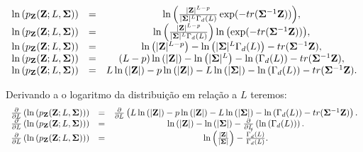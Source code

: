 \documentclass[12pt,a4paper]{article}
\begin{document}
\begin{equation}\label{sec41eqn6}
\begin{array}{ccc}
	\ln{\left(p_{{\bf Z}}({\bf Z};L,{\bf \Sigma})\right)}&=&\ln{\left(\frac{|{\bf Z}|^{L-p}}{|{\bf \Sigma}|^{L}\Gamma_d(L)} \exp(-tr({\bf \Sigma}^{-1}{\bf Z}))\right)}, \\
	\ln{\left(p_{{\bf Z}}({\bf Z};L,{\bf \Sigma})\right)}&=&\ln{\left(\frac{|{\bf Z}|^{L-p}}{|{\bf \Sigma}|^{L}\Gamma_d(L)}\right)}\ln{\left( \exp(-tr({\bf \Sigma}^{-1}{\bf Z}))\right)}, \\
	\ln{\left(p_{{\bf Z}}({\bf Z};L,{\bf \Sigma})\right)}&=&\ln{\left(|{\bf Z}|^{L-p}\right)} - \ln{\left(|{\bf \Sigma}|^{L}\Gamma_d(L)\right)}-tr({\bf \Sigma}^{-1}{\bf Z}), \\
	\ln{\left(p_{{\bf Z}}({\bf Z};L,{\bf \Sigma})\right)}&=&(L-p)\ln{\left(|{\bf Z}|\right)} - \ln{\left(|{\bf \Sigma}|^{L}\right)}-\ln{\left(\Gamma_d(L)\right)}-tr({\bf \Sigma}^{-1}{\bf Z}), \\
	\ln{\left(p_{{\bf Z}}({\bf Z};L,{\bf \Sigma})\right)}&=&L\ln{\left(|{\bf Z}|\right)}-p\ln{\left(|{\bf Z}|\right)} - L\ln{\left(|{\bf \Sigma}|\right)}-\ln{\left(\Gamma_d(L)\right)}-tr({\bf \Sigma}^{-1}{\bf Z}). \\
\end{array}
\end{equation}

Derivando a o logaritmo da distribuição em relação a $L$ teremos:
\begin{equation}\label{sec41eqn7}
\begin{array}{ccc}
	\frac{\partial}{\partial L}\left(\ln{\left(p_{{\bf Z}}({\bf Z};L,{\bf \Sigma})\right)}\right)&=&\frac{\partial}{\partial L}\left(L\ln{\left(|{\bf Z}|\right)}-p\ln{\left(|{\bf Z}|\right)} - L\ln{\left(|{\bf \Sigma}|\right)}-\ln{\left(\Gamma_d(L)\right)}-tr({\bf \Sigma}^{-1}{\bf Z})\right). \\
	\frac{\partial}{\partial L}\left(\ln{\left(p_{{\bf Z}}({\bf Z};L,{\bf \Sigma})\right)}\right)&=&\ln{\left(|{\bf Z}|\right)} - \ln{\left(|{\bf \Sigma}|\right)}-\frac{\partial}{\partial L}\left(\ln{\left(\Gamma_d(L)\right)}\right). \\
	\frac{\partial}{\partial L}\left(\ln{\left(p_{{\bf Z}}({\bf Z};L,{\bf \Sigma})\right)}\right)&=&\ln{\left(\frac{|{\bf Z}|}{|{\bf \Sigma}|}\right)} - \frac{\Gamma^{'}_d(L)}{\Gamma_d(L)}. \\
\end{array}
\end{equation}
\end{document}

